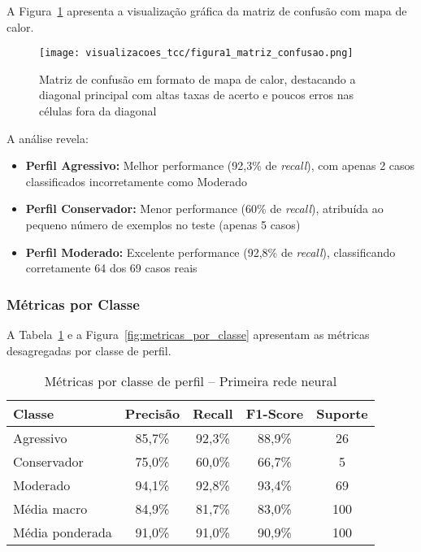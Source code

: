A Figura~\ref{fig:matriz_confusao} apresenta a visualização gráfica da matriz de confusão com mapa de calor.

\begin{figure}[htbp]
    \centering
    \texttt{[image: visualizacoes\_tcc/figura1\_matriz\_confusao.png]}
    \caption{Matriz de confusão em formato de mapa de calor, destacando a diagonal principal com altas taxas de acerto e poucos erros nas células fora da diagonal}
    \label{fig:matriz_confusao}
\end{figure}

A análise revela:
\begin{itemize}
    \item \textbf{Perfil Agressivo:} Melhor performance (92,3\% de \textit{recall}), com apenas 2 casos classificados incorretamente como Moderado
    \item \textbf{Perfil Conservador:} Menor performance (60\% de \textit{recall}), atribuída ao pequeno número de exemplos no teste (apenas 5 casos)
    \item \textbf{Perfil Moderado:} Excelente performance (92,8\% de \textit{recall}), classificando corretamente 64 dos 69 casos reais
\end{itemize}

\subsubsection{Métricas por Classe}

A Tabela~\ref{tab:metricas_por_classe_primeira_rede} e a Figura~\ref{fig:metricas_por_classe} apresentam as métricas desagregadas por classe de perfil.

\begin{table}[htbp]
\centering
\caption{Métricas por classe de perfil -- Primeira rede neural}
\label{tab:metricas_por_classe_primeira_rede}
\begin{tabular}{@{}lcccc@{}}
\toprule
\textbf{Classe} & \textbf{Precisão} & \textbf{Recall} & \textbf{F1-Score} & \textbf{Suporte} \\ \midrule
Agressivo & 85,7\% & 92,3\% & 88,9\% & 26 \\
Conservador & 75,0\% & 60,0\% & 66,7\% & 5 \\
Moderado & 94,1\% & 92,8\% & 93,4\% & 69 \\ \midrule
Média macro & 84,9\% & 81,7\% & 83,0\% & 100 \\
Média ponderada & 91,0\% & 91,0\% & 90,9\% & 100 \\ \bottomrule
\end{tabular}
\end{table}

